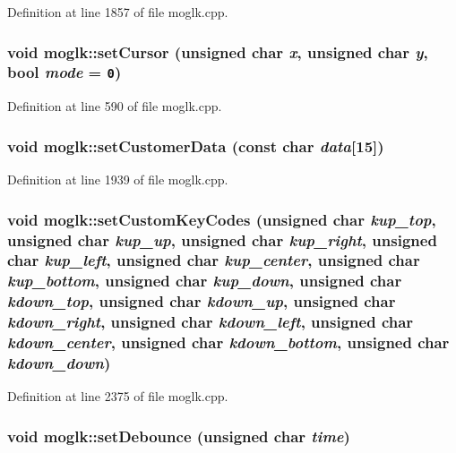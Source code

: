 Definition at line 1857 of file moglk.cpp.\hypertarget{classmoglk_15e0fbeefcab8874138e8865c53e204c}{
\subsubsection[{setCursor}]{\setlength{\rightskip}{0pt plus 5cm}void moglk::setCursor (unsigned char {\em x}, \/  unsigned char {\em y}, \/  bool {\em mode} = {\tt 0})}}
\label{classmoglk_15e0fbeefcab8874138e8865c53e204c}




Definition at line 590 of file moglk.cpp.\hypertarget{classmoglk_fbbdba07a24998b82fa0690a6a4d5f31}{
\subsubsection[{setCustomerData}]{\setlength{\rightskip}{0pt plus 5cm}void moglk::setCustomerData (const char {\em data}\mbox{[}15\mbox{]})}}
\label{classmoglk_fbbdba07a24998b82fa0690a6a4d5f31}




Definition at line 1939 of file moglk.cpp.\hypertarget{classmoglk_fbe1a25a8d461d02dd84df8b7a8b796b}{
\subsubsection[{setCustomKeyCodes}]{\setlength{\rightskip}{0pt plus 5cm}void moglk::setCustomKeyCodes (unsigned char {\em kup\_\-top}, \/  unsigned char {\em kup\_\-up}, \/  unsigned char {\em kup\_\-right}, \/  unsigned char {\em kup\_\-left}, \/  unsigned char {\em kup\_\-center}, \/  unsigned char {\em kup\_\-bottom}, \/  unsigned char {\em kup\_\-down}, \/  unsigned char {\em kdown\_\-top}, \/  unsigned char {\em kdown\_\-up}, \/  unsigned char {\em kdown\_\-right}, \/  unsigned char {\em kdown\_\-left}, \/  unsigned char {\em kdown\_\-center}, \/  unsigned char {\em kdown\_\-bottom}, \/  unsigned char {\em kdown\_\-down})}}
\label{classmoglk_fbe1a25a8d461d02dd84df8b7a8b796b}




Definition at line 2375 of file moglk.cpp.\hypertarget{classmoglk_39a75ecd8ae42aedc0c6fa94e29da5e2}{
\subsubsection[{setDebounce}]{\setlength{\rightskip}{0pt plus 5cm}void moglk::setDebounce (unsigned char {\em time})}}
\label{classmoglk_39a75ecd8ae42aedc0c6fa94e29da5e2}




